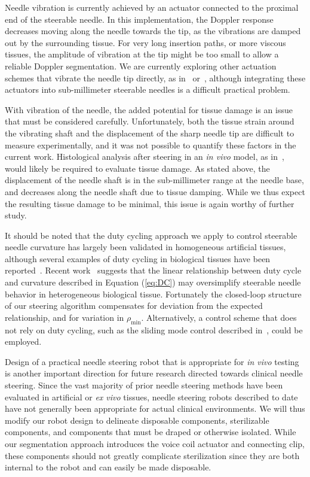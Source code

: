 Needle vibration is currently achieved by an actuator connected to the proximal end of the steerable needle. In this implementation, the Doppler response decreases moving along the needle towards the tip, as the vibrations are damped out by the surrounding tissue. For very long insertion paths, or more viscous tissues, the amplitude of vibration at the tip might be too small to allow a reliable Doppler segmentation. We are currently exploring other actuation schemes that vibrate the needle tip directly, as in~\cite{Harmat2006} or~\cite{McAleavey2003}, although integrating these actuators into sub-millimeter steerable needles is a difficult practical problem.

With vibration of the needle, the added potential for tissue damage is an issue that must be considered carefully. Unfortunately, both the tissue strain around the vibrating shaft and the displacement of the sharp needle tip are difficult to measure experimentally, and it was not possible to quantify these factors in the current work. Histological analysis after steering in an \textit{in vivo} model, as in~\cite{Majewicz2012}, would likely be required to evaluate tissue damage. As stated above, the displacement of the needle shaft is in the sub-millimeter range at the needle base, and decreases along the needle shaft due to tissue damping. While we thus expect the resulting tissue damage to be minimal, this issue is again worthy of further study.

It should be noted that the duty cycling approach we apply to control steerable needle curvature has largely been validated in homogeneous artificial tissues, although several examples of duty cycling in biological tissues have been reported~\cite{Engh2010,Patil2014,Swaney2013}. Recent work~\cite{Patil2014} suggests that the linear relationship between duty cycle and curvature described in Equation (\ref{eq:DC}) may oversimplify steerable needle behavior in heterogeneous biological tissue. Fortunately the closed-loop structure of our steering algorithm compensates for deviation from the expected relationship, and for variation in $\rho_\text{min}$. Alternatively, a control scheme that does not rely on duty cycling, such as the sliding mode control described in~\cite{Rucker2013}, could be employed.

Design of a practical needle steering robot that is appropriate for \textit{in vivo} testing is another important direction for future research directed towards clinical needle steering. Since the vast majority of prior needle steering methods have been evaluated in artificial or \textit{ex vivo} tissues, needle steering robots described to date have not generally been appropriate for actual clinical environments. We will thus modify our robot design to delineate disposable components, sterilizable components, and components that must be draped or otherwise isolated. While our segmentation approach introduces the voice coil actuator and connecting clip, these components should not greatly complicate sterilization since they are both internal to the robot and can easily be made disposable.
